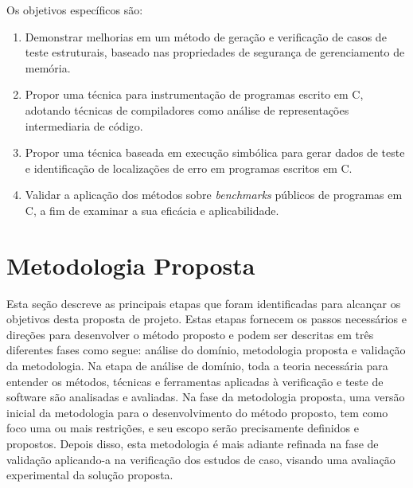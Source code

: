 Os objetivos específicos são:
\begin{enumerate}
\item Demonstrar melhorias em um método de geração e verificação 
  de casos de teste estruturais, baseado nas propriedades de 
  segurança de gerenciamento de memória.
  
\item Propor uma técnica para instrumentação de programas escrito em
  C, adotando técnicas de compiladores como análise de representações
  intermediaria de código.
    
\item Propor uma técnica baseada em execução simbólica para gerar
  dados de teste e identificação de localizações de erro em programas
  escritos em C.
   
\item Validar a aplicação dos métodos sobre \textit{benchmarks} públicos de
  programas em C, a fim de examinar a sua eficácia e aplicabilidade.
\end{enumerate}


\section{Metodologia Proposta}
Esta seção descreve as principais etapas que foram identificadas para alcançar os objetivos desta proposta de projeto. Estas etapas fornecem os passos necessários e direções para desenvolver o método proposto e podem ser descritas em três diferentes fases como segue: 
análise do domínio, metodologia proposta e validação da metodologia.
%
Na etapa de análise de domínio, toda a teoria necessária para entender os métodos, técnicas e ferramentas aplicadas à verificação e teste de software são analisadas e avaliadas. 
%
Na fase da metodologia proposta, uma versão inicial da metodologia para o desenvolvimento do 
método proposto, tem como foco uma ou mais restrições, e seu escopo serão precisamente definidos e propostos. 
%
Depois disso, esta metodologia é mais adiante refinada na fase de validação aplicando-a na verificação dos estudos de caso, visando uma avaliação experimental da solução proposta.


